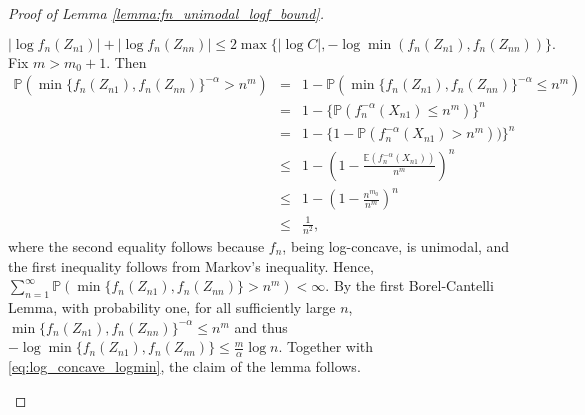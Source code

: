 \documentclass[12pt,letterpaper, twoside, openany]{article}
\theoremstyle{plain}
\newtheorem{lemma}[theorem]{Lemma}
\begin{document}
\begin{proof}[Proof of Lemma \ref{lemma:fn_unimodal_logf_bound}]
\begin{enumerate}[(a)]
\begin{equation}
            |\log f_n(Z_{n1})| + |\log f_n(Z_{nn})| \leq 2\max\{  |\log C|, - \log \min (f_n(Z_{n1}), f_n(Z_{nn}))\}.
        \end{equation}
Fix $m > m_0 + 1$. Then
	\begin{eqnarray*}
		\mathbb{P}( \min \{f_n(Z_{n1}), f_n(Z_{nn})\}^{-\alpha} > n^m) &=& 1 - \mathbb{P}(\min \{f_n(Z_{n1}), f_n(Z_{nn})\}^{-\alpha} \leq n^m) \\
		&=& 1 - \{ \mathbb{P}(f^{-\alpha}_n(X_{n1}) \leq n^m )  \}^n\\
		&=& 1 - \{1 - \mathbb{P}(f^{-\alpha}_n(X_{n1}) > n^m) )  \}^n \\
		& \leq & 1 - \left( 1 - \frac{ \mathbb{E} (f^{-\alpha}_n(X_{n1})) }{n^m} \right)^n \\
		& \leq & 1 - \left( 1 - \frac{ n^{m_0}}{n^m} \right)^n \\
		& \leq & \frac{1}{n^2},
	\end{eqnarray*}
	where the second equality follows because $f_n$, being log-concave, is unimodal, and the first inequality follows from Markov's inequality. Hence,  $\sum^\infty_{n=1} \mathbb{P}(\min \{f_n(Z_{n1}), f_n(Z_{nn})\} > n^m) < \infty$. By the first Borel-Cantelli Lemma, with  probability one, for all sufficiently large  $n$, $\min \{f_n(Z_{n1}), f_n(Z_{nn})\}^{-\alpha} \leq n^m$ and thus $-\log \min \{f_n(Z_{n1}), f_n(Z_{nn})\} \leq \frac{m}{\alpha} \log n$. Together with \ref{eq:log_concave_logmin}, the claim of the lemma follows.
    \end{enumerate}
    
\end{proof}

	
\end{document}
